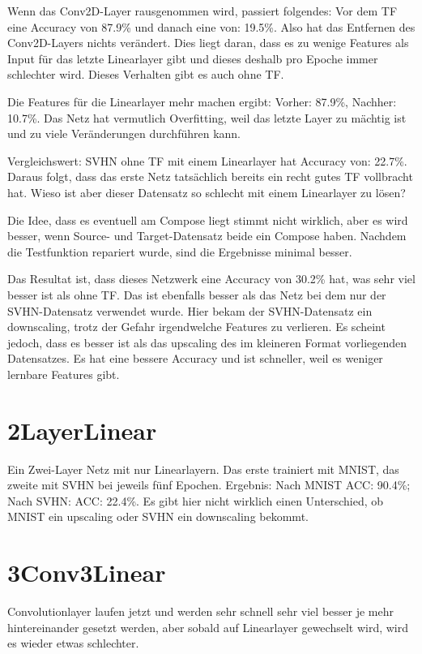     Wenn das Conv2D-Layer rausgenommen wird, passiert folgendes: 
    Vor dem TF eine Accuracy von 87.9\% und danach eine von: 19.5\%. Also hat das Entfernen des 
    Conv2D-Layers nichts verändert. Dies liegt daran, dass es zu wenige Features als Input 
    für das letzte Linearlayer gibt und dieses deshalb pro Epoche immer schlechter wird. 
    Dieses Verhalten gibt es auch ohne TF. 

    Die Features für die Linearlayer mehr machen ergibt: 
    Vorher: 87.9\%, Nachher: 10.7\%. Das Netz hat vermutlich Overfitting, weil das 
    letzte Layer zu mächtig ist und zu viele Veränderungen durchführen kann. 

    Vergleichswert: SVHN ohne TF mit einem Linearlayer hat Accuracy von: 22.7\%.
    Daraus folgt, dass das erste Netz tatsächlich bereits ein recht gutes TF vollbracht hat. 
    Wieso ist aber dieser Datensatz so schlecht mit einem Linearlayer zu lösen?

    Die Idee, dass es eventuell am Compose liegt stimmt nicht wirklich, aber es wird besser, 
    wenn Source- und Target-Datensatz beide ein Compose haben.
    Nachdem die Testfunktion repariert wurde, sind die Ergebnisse minimal besser. 

    Das Resultat ist, dass dieses Netzwerk eine Accuracy von 30.2\% hat, was sehr viel 
    besser ist als ohne TF.
    Das ist ebenfalls besser als das Netz bei dem nur der SVHN-Datensatz verwendet wurde. 
    Hier bekam der SVHN-Datensatz ein downscaling, trotz der Gefahr irgendwelche Features 
    zu verlieren. Es scheint jedoch, dass es besser ist als das upscaling des im kleineren 
    Format vorliegenden Datensatzes. Es hat eine bessere Accuracy und ist schneller, weil 
    es weniger lernbare Features gibt.

\section{2LayerLinear}
    Ein Zwei-Layer Netz mit nur Linearlayern. Das erste trainiert mit MNIST, das zweite 
    mit SVHN bei jeweils fünf Epochen. Ergebnis: Nach MNIST ACC: 90.4\%; Nach SVHN: ACC: 22.4\%. 
    Es gibt hier nicht wirklich einen Unterschied, ob MNIST ein upscaling oder SVHN ein downscaling 
    bekommt.

\section{3Conv3Linear}
    Convolutionlayer laufen jetzt und werden sehr schnell sehr viel besser je mehr hintereinander 
    gesetzt werden, aber sobald auf Linearlayer gewechselt wird, wird es wieder etwas schlechter.

